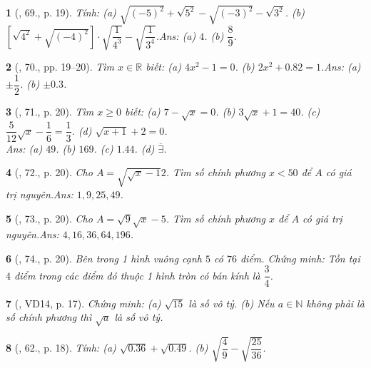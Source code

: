 \documentclass{article}
\newtheorem{baitoan}{}
\begin{document}
\begin{baitoan}[\cite{Tuyen_Toan_7}, 69., p. 19]
	Tính: (a) $\sqrt{(-5)^2} + \sqrt{5^2} - \sqrt{(-3)^2} - \sqrt{3^2}$. (b) $\left[\sqrt{4^2} + \sqrt{(-4)^2}\right]\cdot\sqrt{\dfrac{1}{4^3}} - \sqrt{\dfrac{1}{3^4}}$.\hfill{\sf Ans:} (a) $4$. (b) $\dfrac{8}{9}$.
\end{baitoan}

\begin{baitoan}[\cite{Tuyen_Toan_7}, 70., pp. 19--20]
	Tìm $x\in\mathbb{R}$ biết: (a) $4x^2 - 1 = 0$. (b) $2x^2 + 0.82 = 1$.\hfill{\sf Ans:} (a) $\pm\dfrac{1}{2}$. (b) $\pm0.3$.
\end{baitoan}

\begin{baitoan}[\cite{Tuyen_Toan_7}, 71., p. 20]
	Tìm $x\ge 0$ biết: (a) $7 - \sqrt{x} = 0$. (b) $3\sqrt{x} + 1 = 40$. (c) $\dfrac{5}{12}\sqrt{x} - \dfrac{1}{6} = \dfrac{1}{3}$. (d) $\sqrt{x + 1} + 2 = 0$.
	\\\mbox{}\hfill{\sf Ans:} (a) $49$. (b) $169$. (c) $1.44$. (d) $\overline{\exists}$.
\end{baitoan}

\begin{baitoan}[\cite{Tuyen_Toan_7}, 72., p. 20]
	Cho $A = \sqrt{\sqrt{x} - 1}{2}$. Tìm số chính phương $x < 50$ để $A$ có giá trị nguyên.\hfill{\sf Ans:} $1,9,25,49$.
\end{baitoan}

\begin{baitoan}[\cite{Tuyen_Toan_7}, 73., p. 20]
	Cho $A = \sqrt{9}{\sqrt{x} - 5}$. Tìm số chính phương $x$ để $A$ có giá trị nguyên.\hfill{\sf Ans:} $4,16,36,64,196$.
\end{baitoan}

\begin{baitoan}[\cite{Tuyen_Toan_7}, 74., p. 20]
	Bên trong 1 hình vuông cạnh $5$ có $76$ điểm. Chứng minh: Tồn tại $4$ điểm trong các điểm đó thuộc 1 hình tròn có bán kính là $\dfrac{3}{4}$.
\end{baitoan}

\begin{baitoan}[\cite{Binh_Toan_7_tap_1}, VD14, p. 17]
	Chứng minh: (a) $\sqrt{15}$ là số vô tỷ. (b) Nếu $a\in\mathbb{N}$ không phải là số chính phương thì $\sqrt{a}$ là số vô tỷ.	
\end{baitoan}

\begin{baitoan}[\cite{Binh_Toan_7_tap_1}, 62., p. 18]
	Tính: (a) $\sqrt{0.36} + \sqrt{0.49}$. (b) $\sqrt{\dfrac{4}{9}} - \sqrt{\dfrac{25}{36}}$.
\end{baitoan}
\end{document}
